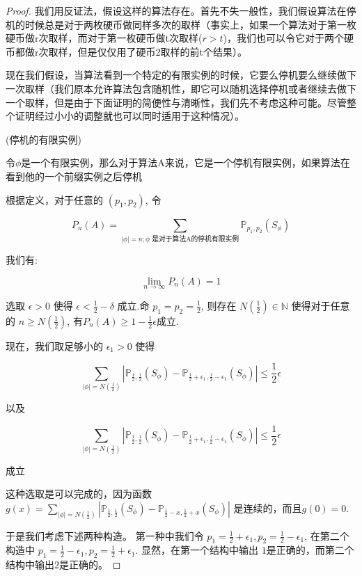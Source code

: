 \documentclass[bachelor]{thuthesis}
\begin{document}
\begin{proof}

我们用反证法，假设这样的算法存在。首先不失一般性，我们假设算法在停机的时候总是对于两枚硬币做同样多次的取样（事实上，如果一个算法对于第一枚硬币做r次取样，而对于第一枚硬币做t次取样($r>t$)，我们也可以令它对于两个硬币都做r次取样，但是仅仅用了硬币2取样的前t个结果）。

现在我们假设，当算法看到一个特定的有限实例的时候，它要么停机要么继续做下一次取样（我们原本允许算法包含随机性，即它可以随机选择停机或者继续去做下一个取样，但是由于下面证明的简便性与清晰性，我们先不考虑这种可能。尽管整个证明经过小小的调整就也可以同时适用于这种情况）。

\begin{definition}(停机的有限实例)

令$\phi$是一个有限实例，那么对于算法A来说，它是一个停机有限实例，如果算法在看到他的一个前缀实例之后停机

\end{definition}

根据定义，对于任意的 $(p_1,p_2)$, 令

\[P_n(A)=\sum_{|\phi|=n; \phi \text{ 是对于算法A的停机有限实例}}\mathbb{P}_{p_1,p_2}(S_\phi)\]

我们有:

\[\lim_{n\to \infty}P_n(A)=1\]

选取 $\epsilon>0$ 使得 $\epsilon<\frac{1}{2}-\delta$ 成立.命 $p_1=p_2=\frac{1}{2}$, 则存在 $N(\frac{1}{2})\in \mathbb{N}$ 使得对于任意的 $n\ge N(\frac{1}{2})$, 有$P_n(A)\ge 1-\frac{1}{2}\epsilon$成立.

现在，我们取足够小的 $\epsilon_1>0$ 使得

\[\sum_{|\phi|=N(\frac{1}{2})}
|\mathbb{P}_{\frac{1}{2},\frac{1}{2}}(S_{\phi})-\mathbb{P}_{\frac{1}{2}+\epsilon_1,\frac{1}{2}-\epsilon_1}(S_{\phi})|
\le \frac{1}{2}\epsilon\]

以及

\[\sum_{|\phi|=N(\frac{1}{2})}
|\mathbb{P}_{\frac{1}{2},\frac{1}{2}}(S_{\phi})-\mathbb{P}_{\frac{1}{2}+\epsilon_1,\frac{1}{2}-\epsilon_1}(S_{\phi})|
\le \frac{1}{2}\epsilon\]

成立

这种选取是可以完成的，因为函数$g(x)=\sum_{|\phi|=N(\frac{1}{2})}
|\mathbb{P}_{\frac{1}{2},\frac{1}{2}}(S_{\phi})-\mathbb{P}_{\frac{1}{2}-x,\frac{1}{2}+x}(S_{\phi})|$ 是连续的，而且$g(0)=0$.

于是我们考虑下述两种构造。 第一种中我们令 $p_1=\frac{1}{2}+\epsilon_1, p_2=\frac{1}{2}-\epsilon_1$, 在第二个构造中 $p_1=\frac{1}{2}-\epsilon_1, p_2=\frac{1}{2}+\epsilon_1$. 显然，在第一个结构中输出 $1$是正确的，而第二个结构中输出$2$是正确的。


\end{proof}
\end{document}

